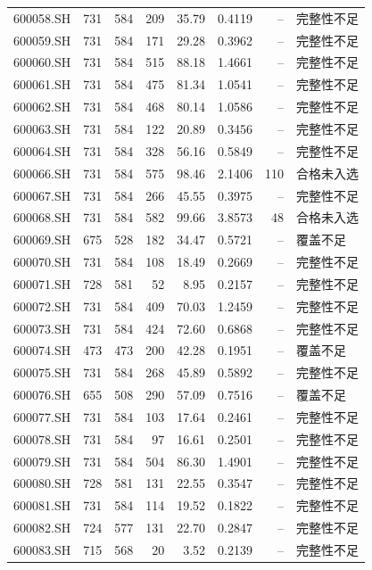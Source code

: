 \documentclass[10pt,a4paper]{article}
\begin{document}
\begin{longtable}{lrrr r r r l}
600058.SH & 731 & 584 & 209 & 35.79 & 0.4119 & -- & 完整性不足\\
600059.SH & 731 & 584 & 171 & 29.28 & 0.3962 & -- & 完整性不足\\
600060.SH & 731 & 584 & 515 & 88.18 & 1.4661 & -- & 完整性不足\\
600061.SH & 731 & 584 & 475 & 81.34 & 1.0541 & -- & 完整性不足\\
600062.SH & 731 & 584 & 468 & 80.14 & 1.0586 & -- & 完整性不足\\
600063.SH & 731 & 584 & 122 & 20.89 & 0.3456 & -- & 完整性不足\\
600064.SH & 731 & 584 & 328 & 56.16 & 0.5849 & -- & 完整性不足\\
600066.SH & 731 & 584 & 575 & 98.46 & 2.1406 & 110 & 合格未入选\\
600067.SH & 731 & 584 & 266 & 45.55 & 0.3975 & -- & 完整性不足\\
600068.SH & 731 & 584 & 582 & 99.66 & 3.8573 & 48 & 合格未入选\\
600069.SH & 675 & 528 & 182 & 34.47 & 0.5721 & -- & 覆盖不足\\
600070.SH & 731 & 584 & 108 & 18.49 & 0.2669 & -- & 完整性不足\\
600071.SH & 728 & 581 & 52 & 8.95 & 0.2157 & -- & 完整性不足\\
600072.SH & 731 & 584 & 409 & 70.03 & 1.2459 & -- & 完整性不足\\
600073.SH & 731 & 584 & 424 & 72.60 & 0.6868 & -- & 完整性不足\\
600074.SH & 473 & 473 & 200 & 42.28 & 0.1951 & -- & 覆盖不足\\
600075.SH & 731 & 584 & 268 & 45.89 & 0.5892 & -- & 完整性不足\\
600076.SH & 655 & 508 & 290 & 57.09 & 0.7516 & -- & 覆盖不足\\
600077.SH & 731 & 584 & 103 & 17.64 & 0.2461 & -- & 完整性不足\\
600078.SH & 731 & 584 & 97 & 16.61 & 0.2501 & -- & 完整性不足\\
600079.SH & 731 & 584 & 504 & 86.30 & 1.4901 & -- & 完整性不足\\
600080.SH & 728 & 581 & 131 & 22.55 & 0.3547 & -- & 完整性不足\\
600081.SH & 731 & 584 & 114 & 19.52 & 0.1822 & -- & 完整性不足\\
600082.SH & 724 & 577 & 131 & 22.70 & 0.2847 & -- & 完整性不足\\
600083.SH & 715 & 568 & 20 & 3.52 & 0.2139 & -- & 完整性不足\\

\end{longtable}
\end{document}
